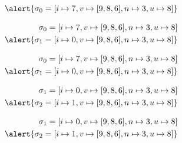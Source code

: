 \documentclass{beamer}
\begin{document}
\begin{frame}
\begin{align*}
\\
  \alert{\sigma_0=[i\mapsto7,v\mapsto[9,8,6],n\mapsto3,u\mapsto8]}
\end{align*}
\begin{center}
\end{center}
\end{frame}

\begin{frame}
\begin{align*}
  \sigma_0=[i\mapsto7,v\mapsto[9,8,6],n\mapsto3,u\mapsto8]
\\
  \alert{\sigma_1=[i\mapsto0,v\mapsto[9,8,6],n\mapsto3,u\mapsto8]}
\end{align*}
\begin{center}
\end{center}
\end{frame}

\begin{frame}
\begin{align*}
  \sigma_0=[i\mapsto7,v\mapsto[9,8,6],n\mapsto3,u\mapsto8]
\\
  \alert{\sigma_1=[i\mapsto0,v\mapsto[9,8,6],n\mapsto3,u\mapsto8]}
\end{align*}
\begin{center}
\end{center}
\end{frame}

\begin{frame}
\begin{align*}
  \sigma_1=[i\mapsto0,v\mapsto[9,8,6],n\mapsto3,u\mapsto8]
\\
  \alert{\sigma_2=[i\mapsto1,v\mapsto[9,8,6],n\mapsto3,u\mapsto8]}
\end{align*}
\begin{center}
\end{center}
\end{frame}

\begin{frame}
\begin{align*}
  \sigma_1=[i\mapsto0,v\mapsto[9,8,6],n\mapsto3,u\mapsto8]
\\
  \alert{\sigma_2=[i\mapsto1,v\mapsto[9,8,6],n\mapsto3,u\mapsto8]}
\end{align*}
\begin{center}
\end{center}
\end{frame}
\end{document}
